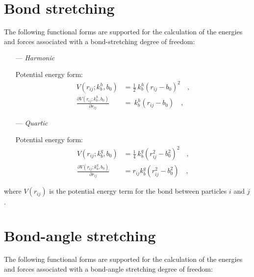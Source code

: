\documentclass[10pt,a4paper]{report}
\numberwithin{equation}{section}
\begin{document}
\section{Bond stretching}
\label{sec:bond-terms}

The following functional forms are supported for the calculation of
the energies and forces associated with a bond-stretching degree of freedom:\cite{GROMOS-doc}

\begin{itemize}
\item [---] \textit{Harmonic}
  \par
  Potential energy form:
  \begin{align}
    \label{eq:harmonic-bond-energy}
    V(r_{ij}; k_b^h, b_0) & = \frac{1}{2} \ k_b^h (r_{ij} - b_0)^2 \quad , \\ \nonumber
    \frac{\partial V(r_{ij}; k_b^h, b_0)}{\partial r_{ij}} & = \ k_b^h (r_{ij} - b_0) \quad ,
  \end{align}
  
\item [---] \textit{Quartic}
  \par
  Potential energy form:
  \begin{align}
    \label{eq:quartic-bond-energy}
    V(r_{ij}; k_b^q, b_0) & = \frac{1}{4} \ k_b^q (r_{ij}^2 - b_0^2)^2 \quad , \\ \nonumber
    \frac{\partial V(r_{ij}; k_b^q, b_0)}{\partial r_{ij}} & = r_{ij} k_b^q (r_{ij}^2 - b_0^2) \quad ,
  \end{align}

\end{itemize}

\noindent
where $V(r_{ij})$ is the potential energy term for the bond between particles $i$ and $j$.

\section{Bond-angle stretching}
\label{sec:angle-terms}

The following functional forms are supported for the calculation of
the energies and forces associated with a bond-angle stretching degree of freedom:\cite{GROMOS-doc,GROMACS-doc}
\end{document}
